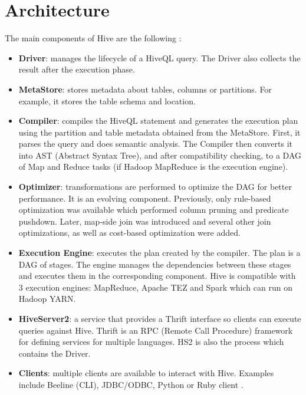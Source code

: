\section{Architecture}
The main components of Hive are the following \cite{Hive-paper}:
\begin{itemize}
	\item \textbf{Driver}: manages the lifecycle of a HiveQL query. The Driver also collects the result after the execution phase.
	\item  \textbf{MetaStore}: stores metadata about tables, columns or partitions. For example, it stores the table schema and location.
	\item \textbf{Compiler}: compiles the HiveQL statement and generates the execution plan using the partition and table metadata obtained from the MetaStore. First, it parses the query and does semantic analysis. The Compiler then converts it into AST (Abstract Syntax Tree), and after compatibility checking, to a DAG of Map and Reduce tasks (if Hadoop MapReduce is the execution engine). 
	\item \textbf{Optimizer}: transformations are performed to optimize the DAG for better performance. It is an evolving component. Previously, only rule-based optimization was available which performed column pruning and predicate pushdown. Later, map-side join was introduced and several other join optimizations, as well as cost-based optimization were added.
	\item \textbf{Execution Engine}: executes the plan created by the compiler. The plan is a DAG of stages. The engine manages the dependencies between these stages and executes them in the corresponding component. Hive is compatible with 3 execution engines: MapReduce, Apache TEZ and Spark which can run on Hadoop YARN.
	\item \textbf{HiveServer2}: a service that provides a Thrift interface so clients can execute queries against Hive. Thrift is an RPC (Remote Call Procedure) framework for defining services for multiple languages. HS2 is also the process which contains the Driver.
	\item \textbf{Clients}: multiple clients are available to interact with Hive. Examples include Beeline (CLI), JDBC/ODBC, Python or Ruby client \etc.
\end{itemize}

